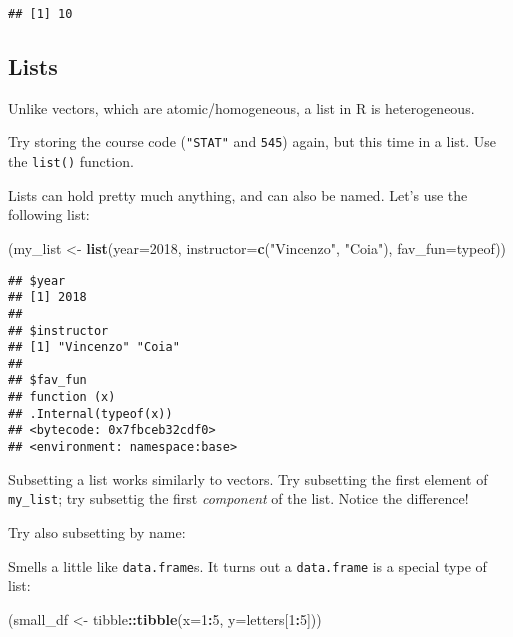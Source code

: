 \documentclass[]{article}
\newenvironment{Shaded}{\begin{snugshade}}{\end{snugshade}}
\newcommand{\KeywordTok}[1]{\textcolor[rgb]{0.13,0.29,0.53}{\textbf{#1}}}
\newcommand{\DataTypeTok}[1]{\textcolor[rgb]{0.13,0.29,0.53}{#1}}
\newcommand{\DecValTok}[1]{\textcolor[rgb]{0.00,0.00,0.81}{#1}}
\newcommand{\StringTok}[1]{\textcolor[rgb]{0.31,0.60,0.02}{#1}}
\newcommand{\OperatorTok}[1]{\textcolor[rgb]{0.81,0.36,0.00}{\textbf{#1}}}
\newcommand{\NormalTok}[1]{#1}
\begin{document}
\begin{verbatim}
## [1] 10
\end{verbatim}

\subsection{Lists}\label{lists}

Unlike vectors, which are atomic/homogeneous, a list in R is
heterogeneous.

Try storing the course code (\texttt{"STAT"} and \texttt{545}) again,
but this time in a list. Use the \texttt{list()} function.

Lists can hold pretty much anything, and can also be named. Let's use
the following list:

\begin{Shaded}
\begin{Highlighting}[]
\NormalTok{(my_list <-}\StringTok{ }\KeywordTok{list}\NormalTok{(}\DataTypeTok{year=}\DecValTok{2018}\NormalTok{, }\DataTypeTok{instructor=}\KeywordTok{c}\NormalTok{(}\StringTok{"Vincenzo"}\NormalTok{, }\StringTok{"Coia"}\NormalTok{), }\DataTypeTok{fav_fun=}\NormalTok{typeof))}
\end{Highlighting}
\end{Shaded}

\begin{verbatim}
## $year
## [1] 2018
## 
## $instructor
## [1] "Vincenzo" "Coia"    
## 
## $fav_fun
## function (x) 
## .Internal(typeof(x))
## <bytecode: 0x7fbceb32cdf0>
## <environment: namespace:base>
\end{verbatim}

Subsetting a list works similarly to vectors. Try subsetting the first
element of \texttt{my\_list}; try subsettig the first \emph{component}
of the list. Notice the difference!

Try also subsetting by name:

Smells a little like \texttt{data.frame}s. It turns out a
\texttt{data.frame} is a special type of list:

\begin{Shaded}
\begin{Highlighting}[]
\NormalTok{(small_df <-}\StringTok{ }\NormalTok{tibble}\OperatorTok{::}\KeywordTok{tibble}\NormalTok{(}\DataTypeTok{x=}\DecValTok{1}\OperatorTok{:}\DecValTok{5}\NormalTok{, }\DataTypeTok{y=}\NormalTok{letters[}\DecValTok{1}\OperatorTok{:}\DecValTok{5}\NormalTok{]))}
\end{Highlighting}
\end{Shaded}
\end{document}
